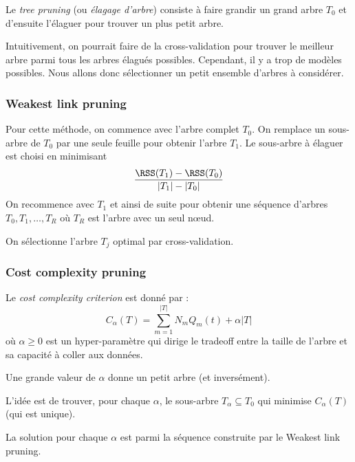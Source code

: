         \begin{definition}
            Le \textit{tree pruning} (ou \textit{élagage d'arbre}) consiste à faire grandir un grand arbre \(T_0\) et d'ensuite l'élaguer pour trouver un plus petit arbre.
        \end{definition}

        Intuitivement, on pourrait faire de la cross-validation pour trouver le meilleur arbre parmi tous les arbres élagués possibles. Cependant, il y a trop de modèles possibles. Nous allons donc sélectionner un petit ensemble d'arbres à considérer.

        \subsubsection{Weakest link pruning}
            Pour cette méthode, on commence avec l'arbre complet \(T_0\). On remplace un sous-arbre de \(T_0\) par une seule feuille pour obtenir l'arbre \(T_1\). Le sous-arbre à élaguer est choisi en minimisant 
            \[
                \frac{\RSS(T_1) - \RSS(T_0)}{|T_1| - |T_0|}
            \]
            On recommence avec \(T_1\) et ainsi de suite pour obtenir une séquence d'arbres \(T_0, T_1, \dots, T_R\) où \(T_R\) est l'arbre avec un seul nœud.
            
            On sélectionne l'arbre \(T_j\) optimal par cross-validation.

        \subsubsection{Cost complexity pruning}
            Le \textit{cost complexity criterion} est donné par :
            \[
                C_\alpha(T) = \sum_{m = 1}^{|T|} N_m Q_m(t) + \alpha |T|
            \]
            où \(\alpha \geq 0\) est un hyper-paramètre qui dirige le tradeoff entre la taille de l'arbre et sa capacité à coller aux données.

            Une grande valeur de \(\alpha\) donne un petit arbre (et inversément).

            L'idée est de trouver, pour chaque \(\alpha\), le sous-arbre \(T_\alpha \subseteq T_0\) qui minimise \(C_\alpha(T)\) (qui est unique).

            \begin{remarque}
                La solution pour chaque \(\alpha\) est parmi la séquence construite par le Weakest link pruning.
            \end{remarque}

